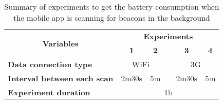 \begin{table}[]
\centering
\begin{tabular}{@{}lcclcc@{}}
\toprule
\multicolumn{1}{c}{\multirow{2}{*}{\textbf{Variables}}} & \multicolumn{5}{c}{\textbf{Experiments}}                                                                   \\ \cmidrule(l){2-6}
\multicolumn{1}{c}{}                                    & \textbf{1}                & \textbf{2}             &  & \textbf{3}                & \textbf{4}             \\ \midrule
\textbf{Data connection type}                           & \multicolumn{2}{c}{WiFi}                           &  & \multicolumn{2}{c}{3G}                             \\ \cmidrule(lr){2-3} \cmidrule(l){5-6}
\textbf{Interval between each scan}                     & \multicolumn{1}{r}{2m30s} & \multicolumn{1}{r}{5m} &  & \multicolumn{1}{r}{2m30s} & \multicolumn{1}{r}{5m} \\
\textbf{Experiment duration}                            & \multicolumn{5}{c}{1h}                                                                                     \\ \bottomrule
\end{tabular}
\caption[Battery consumption results]{Summary of experiments to get the battery consumption when the mobile
app is scanning for beacons in the background}
\label{tab:experiments_battery}
\end{table}
